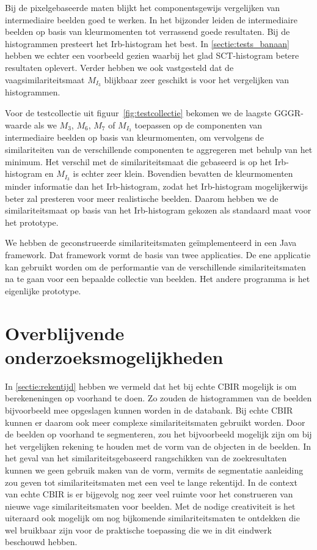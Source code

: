 Bij de pixelgebaseerde maten blijkt het componentsgewijs vergelijken van intermediaire
beelden goed te werken. In het bijzonder leiden de intermediaire beelden op basis van 
kleurmomenten tot verrassend goede resultaten. Bij de histogrammen presteert het 
Irb-histogram het best. In \ref{sectie:tests_banaan} hebben we echter een voorbeeld 
gezien waarbij het glad SCT-histogram betere resultaten oplevert. Verder hebben we
ook vastgesteld dat de vaagsimilariteitsmaat $M_{I_3}$ blijkbaar zeer 
geschikt is voor het vergelijken van histogrammen.

Voor de testcollectie uit figuur~\ref{fig:testcollectie} bekomen we de laagste 
GGGR-waarde als we $M_3$, $M_6$, $M_7$ of $M_{I_3}$ toepassen op 
de componenten
van intermediaire beelden op basis van kleurmomenten, om vervolgens de
similariteiten van de verschillende componenten te aggregeren met behulp van
het minimum. Het verschil met de 
similariteitsmaat die gebaseerd is op het Irb-histogram en $M_{I_3}$ is echter 
zeer klein. Bovendien bevatten de kleurmomenten minder informatie dan het
Irb-histogram, zodat het Irb-histogram mogelijkerwijs beter zal presteren voor
meer realistische beelden. Daarom hebben we de similariteitsmaat op basis
van het Irb-histogram gekozen als standaard maat voor het prototype.

We hebben de geconstrueerde similariteitsmaten ge\"implementeerd in een
Java framework. Dat framework vormt de basis van twee applicaties. De ene
applicatie kan gebruikt worden om de performantie van de
verschillende similariteitsmaten na te gaan voor een bepaalde collectie
van beelden. Het andere programma is het eigenlijke prototype.

\section{Overblijvende onderzoeksmogelijkheden}

In \ref{sectie:rekentijd} hebben we vermeld dat het bij echte CBIR mogelijk is
om berekeneningen op voorhand te doen. Zo zouden de histogrammen van de beelden
bijvoorbeeld mee opgeslagen kunnen worden in de databank. Bij echte CBIR kunnen
er daarom ook meer complexe similariteitsmaten gebruikt worden. Door de beelden
op voorhand te segmenteren, zou het bijvoorbeeld mogelijk zijn om bij het vergelijken
rekening te houden met de vorm van de objecten in de beelden. In het 
geval van het similariteitsgebaseerd rangschikken van de zoekresultaten kunnen we 
geen gebruik maken van de vorm, vermits de segmentatie aanleiding zou geven tot 
similariteitsmaten met een veel te lange rekentijd. In de context van echte CBIR is 
er bijgevolg nog zeer veel ruimte voor het construeren van nieuwe vage 
similariteitsmaten voor beelden. Met de nodige creativiteit is het uiteraard ook 
mogelijk om nog bijkomende similariteitsmaten te ontdekken die wel bruikbaar 
zijn voor de praktische toepassing die we in dit eindwerk beschouwd hebben.

